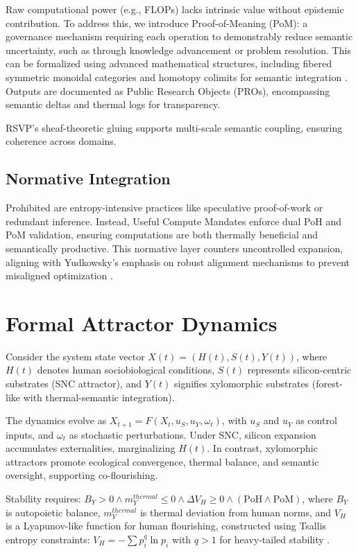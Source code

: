 \documentclass[12pt]{article}
\begin{document}
Raw computational power (e.g., FLOPs) lacks intrinsic value without epistemic contribution. To address this, we introduce Proof-of-Meaning (PoM): a governance mechanism requiring each operation to demonstrably reduce semantic uncertainty, such as through knowledge advancement or problem resolution. This can be formalized using advanced mathematical structures, including fibered symmetric monoidal categories and homotopy colimits for semantic integration \citep{ToenVezzosi2008}. Outputs are documented as Public Research Objects (PROs), encompassing semantic deltas and thermal logs for transparency.

RSVP's sheaf-theoretic gluing \citep{MacLaneMoerdijk1992} supports multi-scale semantic coupling, ensuring coherence across domains.

\subsection{Normative Integration}

Prohibited are entropy-intensive practices like speculative proof-of-work or redundant inference. Instead, Useful Compute Mandates enforce dual PoH and PoM validation, ensuring computations are both thermally beneficial and semantically productive. This normative layer counters uncontrolled expansion, aligning with Yudkowsky's emphasis on robust alignment mechanisms to prevent misaligned optimization \citep{Yudkowsky2004}.

\section{Formal Attractor Dynamics}

Consider the system state vector \( X(t) = (H(t), S(t), Y(t)) \), where \( H(t) \) denotes human sociobiological conditions, \( S(t) \) represents silicon-centric substrates (SNC attractor), and \( Y(t) \) signifies xylomorphic substrates (forest-like with thermal-semantic integration).

The dynamics evolve as \( X_{t+1} = F(X_t, u_S, u_Y, \omega_t) \), with \( u_S \) and \( u_Y \) as control inputs, and \( \omega_t \) as stochastic perturbations. Under SNC, silicon expansion accumulates externalities, marginalizing \( H(t) \). In contrast, xylomorphic attractors promote ecological convergence, thermal balance, and semantic oversight, supporting co-flourishing.

Stability requires: \( B_Y > 0 \wedge m_Y^{thermal} \leq 0 \wedge \Delta V_H \geq 0 \wedge (\text{PoH} \wedge \text{PoM}) \), where \( B_Y \) is autopoietic balance, \( m_Y^{thermal} \) is thermal deviation from human norms, and \( V_H \) is a Lyapunov-like function for human flourishing, constructed using Tsallis entropy constraints: \( V_H = -\sum p_i^q \ln p_i \) with $q > 1$ for heavy-tailed stability \citep{Tsallis1988}.
\end{document}
